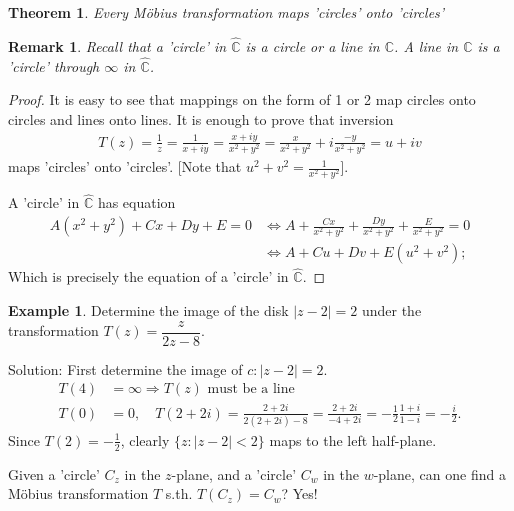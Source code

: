 \documentclass[12pt, a4paper]{article}
\theoremstyle{plain}
\newtheorem{thm}{Theorem} %
\newtheorem{rem}{Remark}
\theoremstyle{definition}
\newtheorem{example}{Example} %
\begin{document}
		\begin{thm}
			Every Möbius transformation maps 'circles' onto 'circles'\\
		\end{thm}

		\begin{rem}
			Recall that a 'circle' in $\hat{\mathbb{C}}$ is a circle or a line in $\mathbb{C}$. A line in $\mathbb{C}$ is a 'circle' through $\infty$ in $\hat{\mathbb{C}}$.\\
		\end{rem}

		\begin{proof}
			It is easy to see that mappings on the form of 1 or 2 map circles onto circles and lines onto lines. It is enough to prove that inversion
			\begin{align*}
				T(z) = \frac{1}{z} = \frac{1}{x+iy} = \frac{x+iy}{x^2+y^2} = \frac{x}{x^2+y^2}+ i \frac{-y}{x^2+y^2} = u+iv
			\end{align*}
			maps 'circles' onto 'circles'. [Note that $u^2+v^2 = \frac{1}{x^2+y^2}$].

			A 'circle' in $\hat{\mathbb{C}}$ has equation
			\begin{align*}
				 A(x^2+y^2) + Cx + Dy + E = 0 &\iff 
				 A + \frac{Cx}{x^2+y^2} + \frac{Dy}{x^2+y^2} + \frac{E}{x^2+y^2} = 0\\ &\iff
				 A + Cu + Dv + E(u^2+v^2);
			\end{align*}
			Which is precisely the equation of a 'circle' in $\hat{\mathbb{C}}$.
		\end{proof}

		\begin{example}
			Determine the image of the disk $|z-2|=2$ under the transformation $T(z) = \dfrac{z}{2z-8}$.

			Solution: First determine the image of $c: |z-2|=2$.
			\begin{align*}
				T(4) &= \infty\Rightarrow \text{$T(z)$ must be a line}\\
				T(0) &= 0,\quad T(2+2i) = \frac{2+2i}{2(2+2i)-8} = \frac{2+2i}{-4+2i} = -\frac{1}{2}\frac{1+i}{1-i} = - \frac{i}{2}.
			\end{align*}
			Since $T(2) = -\frac{1}{2}$, clearly $\{z:|z-2|<2\}$ maps to the left half-plane.
		\end{example}

		Given a 'circle' $C_z$ in the $z$-plane, and a 'circle' $C_w$ in the $w$-plane, can one find a Möbius transformation $T$ s.th. $T(C_z) = C_w$? Yes!
\end{document}
